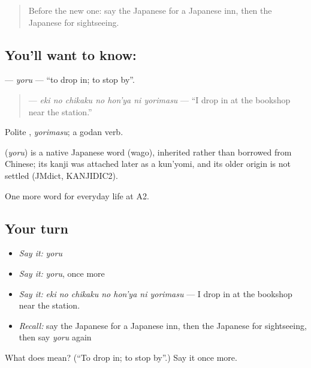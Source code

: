\begin{quote}
Before the new one: say the Japanese for a Japanese inn, then the Japanese for sightseeing.
\end{quote}

\subsection*{You'll want to know: }
\textbf{} — \emph{yoru} — \textquotedblleft{}to drop in; to stop by\textquotedblright{}.

\begin{quote}
\textbf{   } — \emph{eki no chikaku no hon'ya ni yorimasu} — \textquotedblleft{}I drop in at the bookshop near the station.\textquotedblright{}
\end{quote}

Polite \textbf{}, \emph{yorimasu}; a godan verb.

\begin{cousinweb}
\textbf{} (\emph{yoru}) is a native Japanese word (wago), inherited rather than borrowed from Chinese; its kanji was attached later as a kun'yomi, and its older origin is not settled (JMdict, KANJIDIC2).
\end{cousinweb}

\begin{grammarlens}[title={What you've built}]
One more word for everyday life at A2.
\end{grammarlens}

\subsection*{Your turn}
\begin{itemize}
\raggedright
  \item \emph{Say it:} \emph{yoru}
  \item \emph{Say it:} \emph{yoru}, once more
  \item \emph{Say it:} \emph{eki no chikaku no hon'ya ni yorimasu} — I drop in at the bookshop near the station.
  \item \emph{Recall:} say the Japanese for a Japanese inn, then the Japanese for sightseeing, then say \emph{yoru} again
\end{itemize}

\begin{tcolorbox}[breakable,colback=teal!4,colframe=teal!35!black,title={Before you move on}]
What does  mean? (\textquotedblleft{}To drop in; to stop by\textquotedblright{}.) Say it once more.
\end{tcolorbox}
